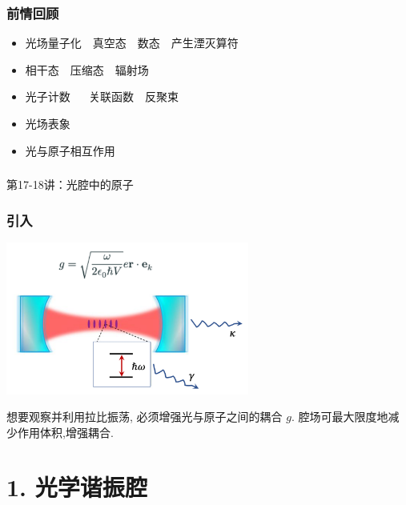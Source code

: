 \begin{frame}
    \frametitle{前情回顾}
    \begin{itemize}
        \item 光场量子化~~真空态~~数态~~产生湮灭算符 
        \item 相干态~~压缩态~~辐射场 
        \item 光子计数 ~~ 关联函数~~反聚束
        \item 光场表象
        \item 光与原子相互作用
    \end{itemize}     
\end{frame}

\begin{frame} [plain]
    \frametitle{}
    \Background[1] 
    \begin{center}
    {\huge 第17-18讲：光腔中的原子}
    \end{center}  
    \addtocounter{framenumber}{-1}   
\end{frame}


\begin{frame} 
\frametitle{引入}
  \begin{center}
       \includegraphics[width=0.6\textwidth]{figs/25.png}
  \end{center}
  想要观察并利用拉比振荡, 必须增强光与原子之间的耦合 $g$. 腔场可最大限度地减少作用体积,增强耦合.
\end{frame}

\section{1. 光学谐振腔}

